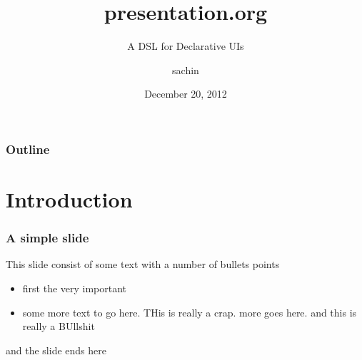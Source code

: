 \documentclass[bigger, presentation]{beamer}
\subtitle{A DSL for Declarative UIs}
\institute{Indian Institute of Technology, Bombay}
\title{presentation.org}
\author{sachin}
\date{December 20, 2012}
\begin{document}
\maketitle

\begin{frame}
\frametitle{Outline}
\setcounter{tocdepth}{3}
\tableofcontents
\end{frame}








\section{Introduction}
\label{sec-1}
\begin{frame}
\frametitle{A simple slide}
\label{sec-1-1}

This slide consist of some text with a number of bullets points

\begin{itemize}
\item first the very important
\item some more text to go here. THis is really a crap. more goes
  here. and this is really a BUllshit
\end{itemize}


and the slide ends here
\end{frame}
\end{document}
